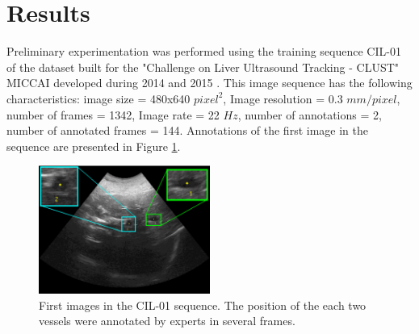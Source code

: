 \documentclass[10pt,a4paper,report]{article}
\begin{document}
\section{Results}
\label{sec:results}
Preliminary experimentation was performed using the training sequence CIL-01 of the dataset built for the "Challenge on Liver Ultrasound Tracking - CLUST" MICCAI developed during 2014 and 2015 \cite{DeLuca2014}. This image sequence has the following characteristics:
image size = 480x640 $pixel^2$, Image resolution = 0.3 $mm/pixel$, number of frames = 1342, Image rate = 22 $Hz$, number of annotations = 2, number of annotated frames = 144. Annotations of the first image in the sequence are presented in Figure  \ref{fig:initialframe}.
\begin{figure}[h!]
\centering
\includegraphics[width=0.5\textwidth]{figures/initialframe2}
\caption{First images in the CIL-01 sequence. The position of the each two vessels were annotated by experts in several frames.} %
\label{fig:initialframe}
\end{figure}
\end{document}
